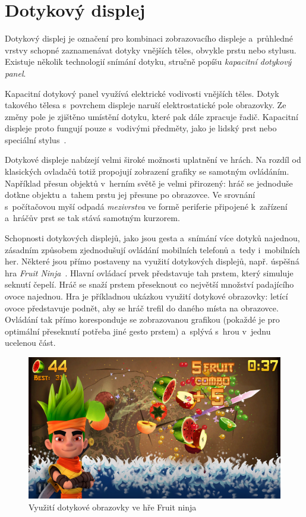 \documentclass[thesis=B,czech,hidelinks]{FITthesis}[2012/06/26] %
\begin{document}
\section{Dotykový displej}
\label{section:touchscreen}

Dotykový displej je označení pro kombinaci zobrazovacího displeje a~průhledné vrstvy schopné zaznamenávat dotyky vnějších těles, obvykle prstu nebo stylusu. Existuje několik technologií snímání dotyku, stručně popíšu \emph{kapacitní dotykový panel}.

Kapacitní dotykový panel využívá elektrické vodivosti vnějších těles. Dotyk takového tělesa s~povrchem displeje naruší elektrostatické pole obrazovky. Ze změny pole je zjištěno umístění dotyku, které pak dále zpracuje řadič. Kapacitní displeje proto fungují pouze s~vodivými předměty, jako je lidský prst nebo speciální stylus~\cite{gray2013does}.

Dotykové displeje nabízejí velmi široké možnosti uplatnění ve hrách. Na rozdíl od klasických ovladačů totiž propojují zobrazení grafiky se samotným ovládáním. Například přesun objektů v~herním světě je velmi přirozený: hráč se jednoduše dotkne objektu a~tahem prstu jej přesune po obrazovce. Ve srovnání s~počítačovou myší odpadá \emph{mezivrstva} ve formě periferie připojené k~zařízení a~hráčův prst se tak stává samotným kurzorem.

Schopnosti dotykových displejů, jako jsou gesta a~snímání více dotyků najednou, zásadním způsobem zjednodušují ovládání mobilních telefonů a~tedy i~mobilních her. Některé jsou přímo postaveny na využití dotykových displejů, např. úspěšná hra \textit{Fruit Ninja}~\cite{fruitninja}. Hlavní ovládací prvek představuje tah prstem, který simuluje seknutí čepelí. Hráč se snaží prstem přeseknout co největší množství padajícího ovoce najednou. Hra je příkladnou ukázkou využití dotykové obrazovky: letící ovoce představuje podnět, aby se hráč trefil do daného místa na obrazovce. Ovládání tak přímo koresponduje se zobrazovanou grafikou (pokaždé je pro optimální přeseknutí potřeba jiné gesto prstem) a~splývá s~hrou v~jednu ucelenou část.

\begin{figure}
\includegraphics[width=\textwidth]{fruit_ninja}
\caption{Využití dotykové obrazovky ve hře Fruit ninja~\cite{fruitninja}}
\end{figure}
\end{document}
